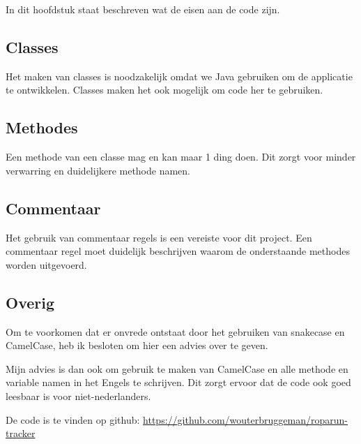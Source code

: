\documentclass[../main.tex]{subfiles}
\begin{document}
In dit hoofdstuk staat beschreven wat de eisen aan de code zijn.

\subsection{Classes}
Het maken van classes is noodzakelijk omdat we Java gebruiken om de applicatie te ontwikkelen.
Classes maken het ook mogelijk om code her te gebruiken.

\subsection{Methodes}
Een methode van een classe mag en kan maar 1 ding doen.
Dit zorgt voor minder verwarring en duidelijkere methode namen.

\subsection{Commentaar}
Het gebruik van commentaar regels is een vereiste voor dit project. Een commentaar regel
moet duidelijk beschrijven waarom de onderstaande methodes worden uitgevoerd.

\subsection{Overig}
Om te voorkomen dat er onvrede ontstaat door het gebruiken van snakecase en CamelCase,
heb ik besloten om hier een advies over te geven.

Mijn advies is dan ook om gebruik te maken van CamelCase en alle methode en variable
namen in het Engels te schrijven. Dit zorgt ervoor dat de code ook goed leesbaar is voor
niet-nederlanders.

De code is te vinden op github:
\url{https://github.com/wouterbruggeman/roparun-tracker}
\end{document}
